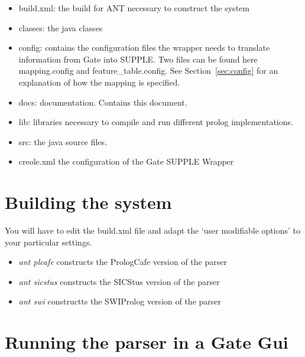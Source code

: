 \documentclass[a4paper,titlepage,openany,twoside]{book}
\begin{document}
\begin{itemize}

\item build.xml: the  build for ANT necessary to construct the system

\item classes: the java classes

\item config: contains the configuration files the wrapper needs to
translate information from Gate into SUPPLE. Two files can be found here
mapping.config and feature\_table.config. See
Section~\ref{sec:config} for an explanation of how the mapping is specified. 


\item docs: documentation. Contains this document.

\item lib: libraries necessary to compile and run different prolog
implementations.

\item src: the java source files.

\item creole.xml the configuration of the Gate SUPPLE Wrapper

\end{itemize}

\chapter{Building the system}

You will have to edit the build.xml file and adapt the `user
modifiable options' to your particular settings.

\begin{itemize}

\item {\em ant plcafe} constructs the PrologCafe version of the parser

\item {\em ant sicstus} constructs the SICStus version of the parser

\item {\em ant swi} constructts the SWIProlog version of the parser

\end{itemize}

\chapter{Running the parser in a Gate Gui}
\end{document}
